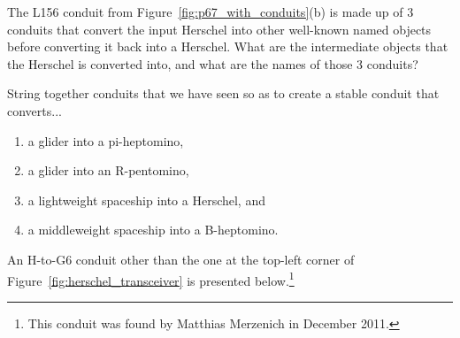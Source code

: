 \begin{multicols}{2}
\mfilbreak


\begin{problem}\label{exer:l156_break_apart}
	The L156 conduit from Figure~\ref{fig:p67_with_conduits}(b) is made up of $3$ conduits that convert the input Herschel into other well-known named objects before converting it back into a Herschel. What are the intermediate objects that the Herschel is converted into, and what are the names of those $3$ conduits?
\end{problem}


\mfilbreak


\begin{problem}\label{exer:composite_converters}
	String together conduits that we have seen so as to create a stable conduit that converts...\smallskip
	
	\begin{enumerate}[label=\bf\color{ocre}(\alph*)]
		\item a glider into a pi-heptomino,
		
		\item a glider into an R-pentomino,
		
		\item a lightweight spaceship into a Herschel, and
		
		\item a middleweight spaceship into a B-heptomino.
	\end{enumerate}
\end{problem}


\mfilbreak


\begin{problem}\label{exer:h_to_g6}
	An H-to-G6 conduit other than the one at the top-left corner of Figure~\ref{fig:herschel_transceiver} is presented below.\footnote{This conduit was found by Matthias Merzenich in December 2011.}
	
	\begin{center}
	\end{center}


\end{problem}
\end{multicols}

